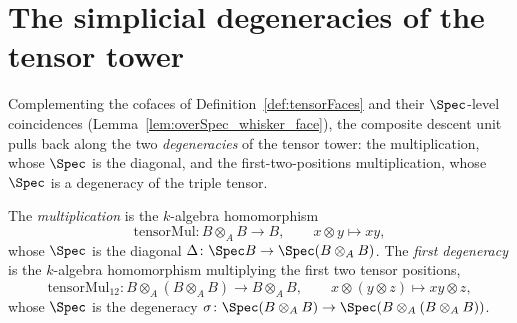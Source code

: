 \section{The simplicial degeneracies of the tensor tower}
\label{sec:specDegeneracy}

Complementing the cofaces of Definition~\ref{def:tensorFaces} and their \(\Spec\)-level
coincidences (Lemma~\ref{lem:overSpec_whisker_face}), the composite descent unit pulls back
along the two \emph{degeneracies} of the tensor tower: the multiplication, whose \(\Spec\)
is the diagonal, and the first-two-positions multiplication, whose \(\Spec\) is a
degeneracy of the triple tensor.

\begin{definition}
  \label{def:tensorMul}
  \leanok
  The \emph{multiplication} is the \(k\)-algebra homomorphism
  \[
    \mathrm{tensorMul} \colon B \otimes_A B \to B, \qquad x \otimes y \mapsto xy ,
  \]
  whose \(\Spec\) is the diagonal \(\Delta \colon \Spec B \to \Spec(B \otimes_A B)\). The
  \emph{first degeneracy} is the \(k\)-algebra homomorphism multiplying the first two tensor
  positions,
  \[
    \mathrm{tensorMul}_{12} \colon B \otimes_A (B \otimes_A B) \to B \otimes_A B, \qquad
    x \otimes (y \otimes z) \mapsto xy \otimes z ,
  \]
  whose \(\Spec\) is the degeneracy \(\sigma \colon \Spec(B \otimes_A B) \to
  \Spec(B \otimes_A (B \otimes_A B))\).
\end{definition}


